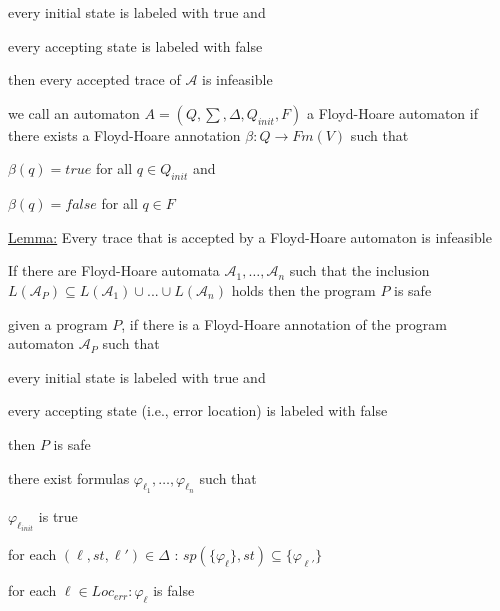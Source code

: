 \documentclass[landscape, a4paper]{article}
\begin{document}
\begin{minipage}[t]{0.2\linewidth}
\begin{betterlist}
		\begin{betterlist}
			\item every initial state is labeled with true and
			\item every accepting state is labeled with false
		\end{betterlist}
    then every accepted trace of $\mathcal{A}$ is infeasible\color{black}
		\item \color{orange}we call an automaton $A = (Q, \sum , \Delta , Q_{init}, F)$ a \alert{Floyd-Hoare automaton} if there exists a Floyd-Hoare annotation $\beta  : Q \rightarrow Fm(V)$ such that
		\begin{betterlist}
			\item $\beta(q) = true$ for all $q \in Q_{init}$ and
			\item $\beta(q) = false$ for all $q \in F$
		\end{betterlist}\color{black}
		\item \underline{Lemma:} Every trace that is accepted by a Floyd-Hoare automaton is infeasible
		\item If there are Floyd-Hoare automata $\mathcal{A}_{1}, \ldots, \mathcal{A}_{n}$ such that the inclusion $L(\mathcal{A}_P) \subseteq L(\mathcal{A}_{1}) \cup . . . \cup L(\mathcal{A}_{n})$ holds then the program $P$ is safe
	\end{betterlist}
	\begin{betterlist}
  \item \color{violet}given a program $P$, if there is a Floyd-Hoare annotation of the program automaton $\mathcal{A}_P$ such that
		\begin{betterlist}
			\item every initial state is labeled with true and
			\item every accepting state (i.e., error location) is labeled with false
		\end{betterlist}
    then $P$ is safe\color{black}
		\begin{betterlist}
			\item there exist formulas $\varphi_{\ell_1},\ldots , \varphi_{\ell_n}$ such that
			\begin{betterlist}
				\item $\varphi_{\ell_{init}}$ is true
				\item for each $(\ell , st, \ell ' ) \in \Delta$ : $sp(\{ \varphi_{\ell} \} , st) \subseteq \{ \varphi_{\ell'}\}$
				\item for each $\ell \in Loc_{err} : \varphi_{\ell}$ is false

\end{betterlist}
\end{betterlist}
\end{betterlist}
\end{minipage}
\end{document}
